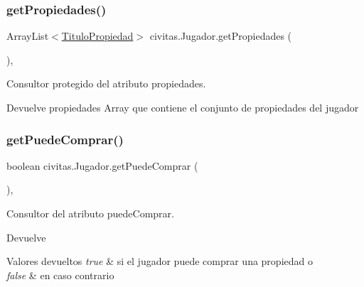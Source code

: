 \subsubsection{\texorpdfstring{get\+Propiedades()}{getPropiedades()}}
{\footnotesize\ttfamily Array\+List$<$\hyperlink{classcivitas_1_1TituloPropiedad}{Titulo\+Propiedad}$>$ civitas.\+Jugador.\+get\+Propiedades (\begin{DoxyParamCaption}{ }\end{DoxyParamCaption})\hspace{0.3cm}{\ttfamily [inline]}, {\ttfamily [protected]}}

Consultor protegido del atributo propiedades. \begin{DoxyReturn}{Devuelve}
propiedades Array que contiene el conjunto de propiedades del jugador 
\end{DoxyReturn}
\mbox{\label{classcivitas_1_1Jugador_a1b548df1bff7883664b0848408ed0232}} 
\subsubsection{\texorpdfstring{get\+Puede\+Comprar()}{getPuedeComprar()}}
{\footnotesize\ttfamily boolean civitas.\+Jugador.\+get\+Puede\+Comprar (\begin{DoxyParamCaption}{ }\end{DoxyParamCaption})\hspace{0.3cm}{\ttfamily [inline]}, {\ttfamily [package]}}

Consultor del atributo puede\+Comprar. \begin{DoxyReturn}{Devuelve}

\end{DoxyReturn}

\begin{DoxyRetVals}{Valores devueltos}
{\em true} & si el jugador puede comprar una propiedad o \\
\hline
{\em false} & en caso contrario \\
\hline
\end{DoxyRetVals}
\mbox{\label{classcivitas_1_1Jugador_a3c9d02f7974457585c0e2a58ccad6c76}} 
